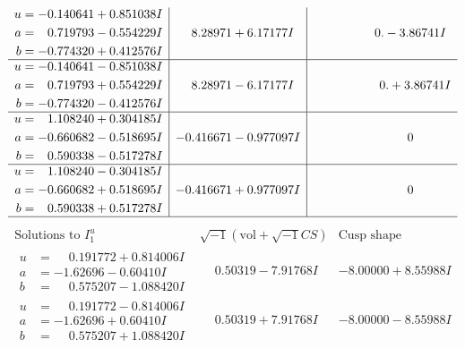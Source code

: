 \documentclass[1p]{elsarticle_modified}
\theoremstyle{definition}
\newcommand{\I}{\sqrt{-1}}
\begin{document}
$$\begin{array}{c|c|c}
\begin{aligned}
u &= -0.140641 + 0.851038 I \\
a &= \phantom{-}0.719793 - 0.554229 I \\
b &= -0.774320 + 0.412576 I\end{aligned}
 & \phantom{-}8.28971 + 6.17177 I & \phantom{-0.000000 } 0. - 3.86741 I \\ \hline\begin{aligned}
u &= -0.140641 - 0.851038 I \\
a &= \phantom{-}0.719793 + 0.554229 I \\
b &= -0.774320 - 0.412576 I\end{aligned}
 & \phantom{-}8.28971 - 6.17177 I & \phantom{-0.000000 -}0. + 3.86741 I \\ \hline\begin{aligned}
u &= \phantom{-}1.108240 + 0.304185 I \\
a &= -0.660682 - 0.518695 I \\
b &= \phantom{-}0.590338 - 0.517278 I\end{aligned}
 & -0.416671 - 0.977097 I & \phantom{-0.000000 } 0 \\ \hline\begin{aligned}
u &= \phantom{-}1.108240 - 0.304185 I \\
a &= -0.660682 + 0.518695 I \\
b &= \phantom{-}0.590338 + 0.517278 I\end{aligned}
 & -0.416671 + 0.977097 I & \phantom{-0.000000 } 0\\
 \hline 
 \end{array}$$\newpage$$\begin{array}{c|c|c}  
\text{Solutions to }I^u_{1}& \I (\text{vol} + \sqrt{-1}CS) & \text{Cusp shape}\\
 \hline 
\begin{aligned}
u &= \phantom{-}0.191772 + 0.814006 I \\
a &= -1.62696 - 0.60410 I \\
b &= \phantom{-}0.575207 - 1.088420 I\end{aligned}
 & \phantom{-}0.50319 - 7.91768 I & -8.00000 + 8.55988 I \\ \hline\begin{aligned}
u &= \phantom{-}0.191772 - 0.814006 I \\
a &= -1.62696 + 0.60410 I \\
b &= \phantom{-}0.575207 + 1.088420 I\end{aligned}
 & \phantom{-}0.50319 + 7.91768 I & -8.00000 - 8.55988 I \\ \hline\begin{aligned}

\end{aligned}
\end{array}$$
\end{document}
